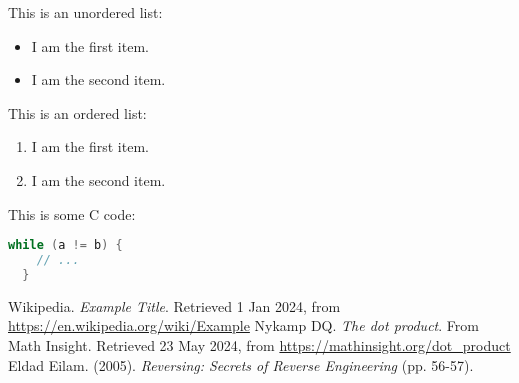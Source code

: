 \documentclass{article}
\begin{document}
This is an unordered list:

\begin{itemize}
  \item I am the first item.
  \item I am the second item.
\end{itemize}

This is an ordered list:

\begin{enumerate}
  \item I am the first item.
  \item I am the second item.
\end{enumerate}

This is some C code:

\begin{lstlisting}[language=C]
  while (a != b) {
    // ...
  }
\end{lstlisting}


\newpage
\begin{thebibliography}{9}
  Wikipedia. \textit{Example Title}. Retrieved 1 Jan 2024, from
  \url{https://en.wikipedia.org/wiki/Example}
  Nykamp DQ. \textit{The dot product}. From Math Insight. Retrieved 23 May 2024, from
  \url{https://mathinsight.org/dot_product}
  Eldad Eilam. (2005). \textit{Reversing: Secrets of Reverse Engineering} (pp. 56-57).
\end{thebibliography}
\end{document}
